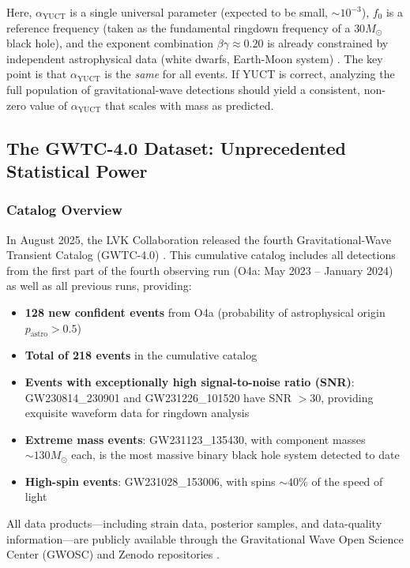 \documentclass[12pt,a4paper]{article}
\theoremstyle{remark}
\begin{document}
	Here, $\alpha_{\text{YUCT}}$ is a single universal parameter (expected to be small, $\sim 10^{-3}$), $f_0$ is a reference frequency (taken as the fundamental ringdown frequency of a $30 M_\odot$ black hole), and the exponent combination $\beta\gamma \approx 0.20$ is already constrained by independent astrophysical data (white dwarfs, Earth-Moon system) . The key point is that $\alpha_{\text{YUCT}}$ is the \textit{same} for all events. If YUCT is correct, analyzing the full population of gravitational-wave detections should yield a consistent, non-zero value of $\alpha_{\text{YUCT}}$ that scales with mass as predicted.
	
	\subsection{The GWTC-4.0 Dataset: Unprecedented Statistical Power}
	
	\subsubsection{Catalog Overview}
	
	In August 2025, the LVK Collaboration released the fourth Gravitational-Wave Transient Catalog (GWTC-4.0) . This cumulative catalog includes all detections from the first part of the fourth observing run (O4a: May 2023 – January 2024) as well as all previous runs, providing:
	
	\begin{itemize}
		\item \textbf{128 new confident events} from O4a (probability of astrophysical origin $p_{\text{astro}} > 0.5$) 
		\item \textbf{Total of 218 events} in the cumulative catalog 
		\item \textbf{Events with exceptionally high signal-to-noise ratio (SNR)}: GW230814\_230901 and GW231226\_101520 have SNR $> 30$, providing exquisite waveform data for ringdown analysis 
		\item \textbf{Extreme mass events}: GW231123\_135430, with component masses $\sim 130 M_\odot$ each, is the most massive binary black hole system detected to date 
		\item \textbf{High-spin events}: GW231028\_153006, with spins $\sim 40\%$ of the speed of light 
	\end{itemize}
	
	All data products—including strain data, posterior samples, and data-quality information—are publicly available through the Gravitational Wave Open Science Center (GWOSC) and Zenodo repositories .
	
\end{document}
